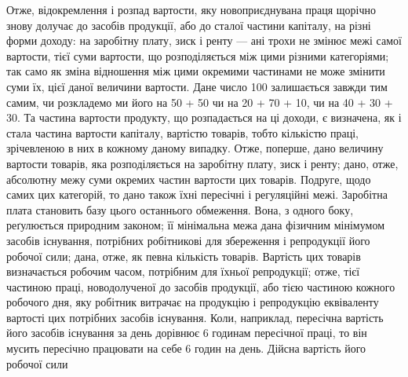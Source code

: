 Отже, відокремлення і розпад вартости, яку новоприєднувана праця щорічно
знову долучає до засобів продукції, або до сталої частини капіталу, на різні форми
доходу: на заробітну плату, зиск і ренту — ані трохи не змінює межі самої вартости,
тієї суми вартости, що розподіляється між цими різними категоріями; так
само як зміна відношення між цими окремими частинами не може змінити суми їх,
цієї даної величини вартости. Дане число 100 залишається завжди тим самим, чи
розкладемо ми його на 50 + 50 чи на 20 + 70 + 10, чи на 40 + 30 + 30. Та
частина вартости продукту, що розпадається на ці доходи, є визначена, як і стала
частина вартости капіталу, вартістю товарів, тобто кількістю праці, зрічевленою
в них в кожному даному випадку. Отже, поперше, дано величину вартости
товарів, яка розподіляється на заробітну плату, зиск і ренту; дано, отже, абсолютну
межу суми окремих частин вартости цих товарів. Подруге, щодо самих
цих категорій, то дано також їхні пересічні і регуляційні межі. Заробітна плата
становить базу цього останнього обмеження. Вона, з одного боку, реґулюється
природним законом; її мінімальна межа дана фізичним мінімумом засобів існування,
потрібних робітникові для збереження і репродукції його робочої сили;
дана, отже, як певна кількість товарів. Вартість цих товарів визначається робочим
часом, потрібним для їхньої репродукції; отже, тієї частиною праці, новодолученої
до засобів продукції, або тією частиною кожного робочого дня, яку
робітник витрачає на продукцію і репродукцію еквіваленту вартості цих потрібних
засобів існування. Коли, наприклад, пересічна вартість його засобів
існування за день дорівнює 6 годинам пересічної праці, то він мусить пересічно
працювати на себе 6 годин на день. Дійсна вартість його робочої сили
\parbreak{}  %
